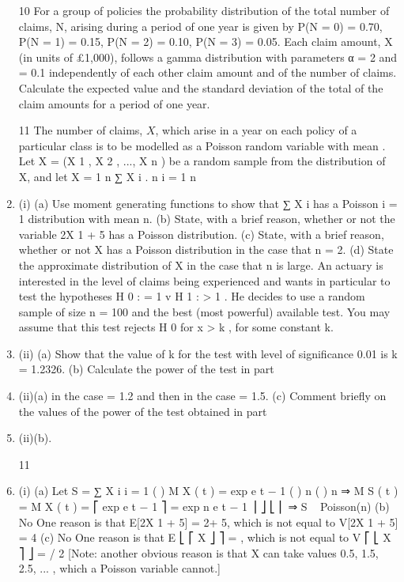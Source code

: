\documentclass[a4paper,12pt]{article}
\begin{document}
\begin{enumerate}
10
For a group of policies the probability distribution of the total number of claims, N,
arising during a period of one year is given by
P(N = 0) = 0.70, P(N = 1) = 0.15, P(N = 2) = 0.10, P(N = 3) = 0.05.
Each claim amount, X (in units of £1,000), follows a gamma distribution with parameters α = 2 and \lambda = 0.1 independently of each other claim amount and of the number of claims.
Calculate the expected value and the standard deviation of the total of the claim amounts for a period of one year.


11
The number of claims, $X$, which arise in a year on each policy of a particular class is to be modelled as a Poisson random variable with mean \lambda. Let X = (X 1 , X 2 , ..., X n ) be a random sample from the distribution of X, and let X =
1 n
∑ X i .
n i = 1
n
\item (i)
(a)
Use moment generating functions to show that
∑ X i has a Poisson
i = 1
distribution with mean n\lambda.
(b) State, with a brief reason, whether or not the variable 2X 1 + 5 has a Poisson distribution.
(c) State, with a brief reason, whether or not X has a Poisson distribution in the case that n = 2.
(d) State the approximate distribution of X in the case that n is large.
An actuary is interested in the level of claims being experienced and wants in particular to test the hypotheses
H 0 : \lambda = 1 v H 1 : \lambda > 1 .
He decides to use a random sample of size n = 100 and the best (most powerful) available test. You may assume that this test rejects H 0 for x > k , for some constant k.
\item (ii)
(a) Show that the value of k for the test with level of significance 0.01 is k = 1.2326.
(b) Calculate the power of the test in part \item (ii)(a) in the case \lambda = 1.2 and then in the case \lambda = 1.5.
(c) Comment briefly on the values of the power of the test obtained in part
\item (ii)(b).
\newpage

11
\item (i)
(a)
Let S = ∑ X i
i = 1
{ (
) }
M X ( t ) = exp \lambda e t − 1
{ (
) }
n
{ (
) }
n
⇒ M S ( t ) = { M X ( t ) } = ⎡ exp \lambda e t − 1 ⎤ = exp n \lambda e t − 1
⎥ ⎦
⎣ ⎢
⇒ S ~ Poisson(n\lambda)
(b)
No
One reason is that E[2X 1 + 5] = 2\lambda + 5, which is not equal to V[2X 1 + 5] = 4%
(c)
No
One reason is that E ⎣ ⎡ X ⎦ ⎤ = \lambda , which is not equal to V ⎡ ⎣ X ⎤ ⎦ = \lambda / 2
[Note: another obvious reason is that X can take values 0.5, 1.5, 2.5, ... , which a Poisson variable cannot.]


\end{enumerate}
\end{document}
